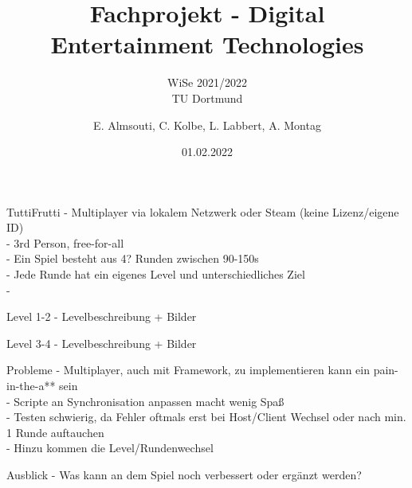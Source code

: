 \documentclass{beamer}
\title{Fachprojekt - Digital Entertainment Technologies}
\subtitle{WiSe 2021/2022 \\ TU Dortmund}
\author{E. Almsouti, C. Kolbe,  L. Labbert, A. Montag}
\institute{}
\date{01.02.2022}
\begin{document}
\begin{frame}
\titlepage
\end{frame}

\begin{frame}{TuttiFrutti}
- Multiplayer via lokalem Netzwerk oder Steam (keine Lizenz/eigene ID) \\

- 3rd Person, free-for-all \\
- Ein Spiel besteht aus 4? Runden zwischen 90-150s \\
- Jede Runde hat ein eigenes Level und unterschiedliches Ziel \\
- 

\end{frame}

\begin{frame}{Level 1-2}
 - Levelbeschreibung + Bilder \\
\end{frame}

\begin{frame}{Level 3-4}
 - Levelbeschreibung + Bilder \\
\end{frame}

\begin{frame}{Probleme}
- Multiplayer, auch mit Framework, zu implementieren kann ein pain-in-the-a** sein \\
- Scripte an Synchronisation anpassen macht wenig Spaß \\
- Testen schwierig, da Fehler oftmals erst bei Host/Client Wechsel oder nach min. 1 Runde auftauchen \\
- Hinzu kommen die Level/Rundenwechsel \\

\end{frame}

\begin{frame}{Ausblick}
- Was kann an dem Spiel noch verbessert oder ergänzt werden? \\

\end{frame}


\end{document}
